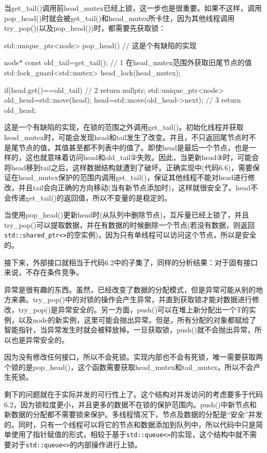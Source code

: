 当get\_tail()调用前head\_mutex已经上锁，这一步也是很重要。如果不这样，调用pop\_head()时就会被get\_tail()和head\_mutex所卡住，因为其他线程调用try\_pop()(以及pop\_head())时，都需要先获取锁：

\begin{cpp}
std::unique_ptr<node> pop_head() // 这是个有缺陷的实现
{
  node* const old_tail=get_tail();  // 1 在head_mutex范围外获取旧尾节点的值
  std::lock_guard<std::mutex> head_lock(head_mutex);

  if(head.get()==old_tail)  // 2
  {
    return nullptr;
  }
  std::unique_ptr<node> old_head=std::move(head);
  head=std::move(old_head->next);  // 3
  return old_head;
}
\end{cpp}

这是一个有缺陷的实现，在锁的范围之外调用get\_tail()。初始化线程并获取head\_mutex时，可能会发现head和tail发生了改变。并且，不只返回尾节点时不是尾节点的值，其值甚至都不列表中的值了。即使head是最后一个节点，也是一样的，这也就意味着访问head和old\_tail②失败。因此，当更新head③时，可能会将head移到tail之后，这样数据结构就遭到了破坏。正确实现中(代码6.6)，需要保证在head\_mutex保护的范围内调用get\_tail()，保证其他线程不能对head进行修改，并且tail会向正确的方向移动(当有新节点添加时)，这样就很安全了。head不会传递get\_tail()的返回值，所以不变量的是稳定的。

当使用pop\_head()更新head时(从队列中删除节点)，互斥量已经上锁了，并且try\_pop()可以提取数据，并在有数据的时候删除一个节点(若没有数据，则返回\texttt{std::shared\_ptr<>}的空实例)，因为只有单线程可以访问这个节点，所以是安全的。

接下来，外部接口就相当于代码6.2中的子集了，同样的分析结果：对于固有接口来说，不存在条件竞争。

异常是很有趣的东西。虽然，已经改变了数据的分配模式，但是异常可能从别的地方来袭。try\_pop()中的对锁的操作会产生异常，并直到获取锁才能对数据进行修改，try\_pop()是异常安全的。另一方面，push()可以在堆上新分配出一个T的实例，以及node的新实例，这里可能会抛出异常。但是，所有分配的对象都赋给了智能指针，当异常发生时就会被释放掉。一旦获取锁，push()就不会抛出异常，所以也是异常安全的。

因为没有修改任何接口，所以不会死锁。实现内部也不会有死锁，唯一需要获取两个锁的是pop\_head()，这个函数需要获取head\_mutex和tail\_mutex，所以不会产生死锁。

剩下的问题就在于实际并发的可行性上了。这个结构对并发访问的考虑要多于代码6.2，因为锁粒度更小，并且更多的数据不在锁的保护范围内。push()中新节点和新数据的分配都不需要锁来保护。多线程情况下，节点及数据的分配是“安全”并发的。同时，只有一个线程可以将它的节点和数据添加到队列中，所以代码中只是简单使用了指针赋值的形式，相较于基于\texttt{std::queue<>}的实现，这个结构中就不需要对于\texttt{std::queue<>}的内部操作进行上锁。

